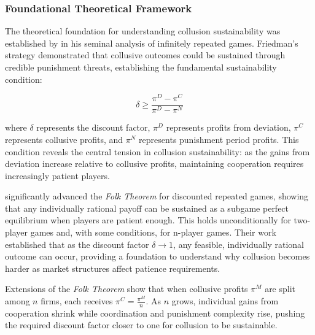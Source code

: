 \subsubsection*{Foundational Theoretical Framework}

The theoretical foundation for understanding collusion sustainability was established by \textcite{friedman_non-cooperative_1971} in his seminal analysis of infinitely repeated games. Friedman's  strategy demonstrated that collusive outcomes could be sustained through credible punishment threats, establishing the fundamental sustainability condition:

\begin{equation}
    \delta \geq \frac{\pi^{D} - \pi^{C}}{\pi^{D} - \pi^{N}}
\end{equation}

where $\delta$ represents the discount factor, $\pi^{D}$ represents profits from deviation, $\pi^{C}$ represents collusive profits, and $\pi^{N}$ represents punishment period profits. This condition reveals the central tension in collusion sustainability: as the gains from deviation increase relative to collusive profits, maintaining cooperation requires increasingly patient players.

\textcite{fudenberg_folk_1986} significantly advanced the \emph{Folk Theorem} for discounted repeated games, showing that any individually rational payoff can be sustained as a subgame perfect equilibrium when players are patient enough. This holds unconditionally for two-player games and, with some conditions, for n-player games. Their work established that as the discount factor $\delta \to 1$, any feasible, individually rational outcome can occur, providing a foundation to understand why collusion becomes harder as market structures affect patience requirements.

Extensions of the \emph{Folk Theorem} show that when collusive profits $\pi^M$ are split among $n$ firms, each receives $\pi^C = \frac{\pi^M}{n}$. As $n$ grows, individual gains from cooperation shrink while coordination and punishment complexity rise, pushing the required discount factor closer to one for collusion to be sustainable.




